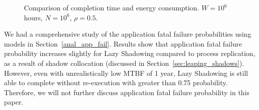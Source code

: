 \begin{figure}[!t]
	\begin{center}
	\end{center}
	\caption{Comparison of completion time and energy consumption. $W=10^6$ hours, $N=10^6$, $\rho=0.5$.}
	\label{fig:3}
\end{figure}

We had a comprehensive study of the application fatal failure probabilities using models in Section~\ref{anal_app_fail}. Results show that application fatal failure probability increases slightly for Lazy Shadowing compared to process replication, as a result of shadow collocation (discussed in Section~\ref{sec:leaping_shadows}). However, even with unrealistically low MTBF of 1 year, Lazy Shadowing is still able to complete without re-execution with greater than 0.75 probability. Therefore, we will not further discuss application fatal failure probability in this paper.  


